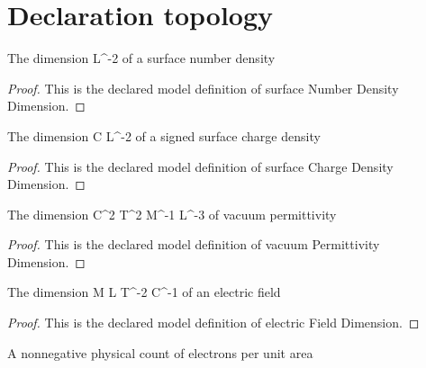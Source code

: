 \section{Declaration topology}
\begin{definition}
  \label{def:physics:phyx-mini-0849:phyxminiproblems-problemphyxmini0849-surfacenumberdensitydimension}
  The dimension L\textasciicircum{}-2 of a surface number density
\end{definition}
\begin{proof}
  This is the declared model definition of surface Number Density Dimension.
\end{proof}
\begin{definition}
  \label{def:physics:phyx-mini-0849:phyxminiproblems-problemphyxmini0849-surfacechargedensitydimension}
  The dimension C L\textasciicircum{}-2 of a signed surface charge density
\end{definition}
\begin{proof}
  This is the declared model definition of surface Charge Density Dimension.
\end{proof}
\begin{definition}
  \label{def:physics:phyx-mini-0849:phyxminiproblems-problemphyxmini0849-vacuumpermittivitydimension}
  The dimension C\textasciicircum{}2 T\textasciicircum{}2 M\textasciicircum{}-1 L\textasciicircum{}-3 of vacuum permittivity
\end{definition}
\begin{proof}
  This is the declared model definition of vacuum Permittivity Dimension.
\end{proof}
\begin{definition}
  \label{def:physics:phyx-mini-0849:phyxminiproblems-problemphyxmini0849-electricfielddimension}
  The dimension M L T\textasciicircum{}-2 C\textasciicircum{}-1 of an electric field
\end{definition}
\begin{proof}
  This is the declared model definition of electric Field Dimension.
\end{proof}
\begin{definition}
  \label{def:physics:phyx-mini-0849:phyxminiproblems-problemphyxmini0849-surfaceelectronnumberdensityquantity}
  A nonnegative physical count of electrons per unit area
\end{definition}

